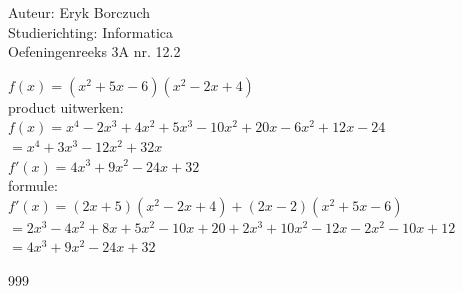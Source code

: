 \documentclass[a4paper]{article}
\begin{document}
  
\noindent \large Auteur: Eryk Borczuch \\
\noindent \large Studierichting: Informatica\\
\noindent \large Oefeningenreeks 3A nr. 12.2\\

\medskip

\normalsize

$f(x) = (x^2+5x-6)(x^2-2x+4)$\\

product uitwerken: \\

$f(x) = x^4 -2x^3 +4x^2 +5x^3 -10x^2 +20x -6x^2 +12x -24$\\

$= x^4 +3x^3 -12x^2 +32x$\\

$f'(x) = 4x^3 +9x^2 -24x + 32$\\

formule: \\

$f'(x) = (2x+5)(x^2-2x+4)+(2x-2)(x^2+5x-6)$\\

$= 2x^3 -4x^2 +8x +5x^2 -10x +20 +2x^3 +10x^2 -12x -2x^2 -10x +12$\\

$= 4x^3 +9x^2 -24x + 32$\\

\begin{thebibliography}{999}
\end{thebibliography}
\end{document}
